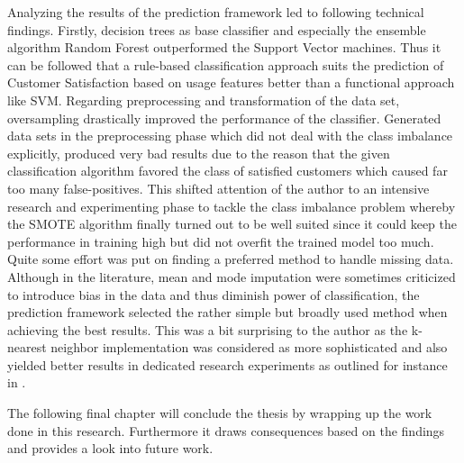 Analyzing the results of the prediction framework led to following technical findings. Firstly, decision trees as base classifier and especially the ensemble algorithm Random Forest outperformed the Support Vector machines. Thus it can be followed that a rule-based classification approach suits the prediction of Customer Satisfaction based on usage features better than a functional approach like SVM. Regarding preprocessing and transformation of the data set, oversampling drastically improved the performance of the classifier. Generated data sets in the preprocessing phase which did not deal with the class imbalance explicitly, produced very bad results due to the reason that the given classification algorithm favored the class of satisfied customers which caused far too many false-positives. This shifted attention of the author to an intensive research and experimenting phase to tackle the class imbalance problem whereby the SMOTE algorithm finally turned out to be well suited since it could keep the performance in training high but did not overfit the trained model too much. Quite some effort was put on finding a preferred method to handle missing data. Although in the literature, mean and mode imputation were sometimes criticized to introduce bias in the data and thus diminish power of classification, the prediction framework selected the rather simple but broadly used method when achieving the best results. This was a bit surprising to the author as the k-nearest neighbor implementation was considered as more sophisticated and also yielded better results in dedicated research experiments as outlined for instance in \cite{batista2003analysis}.

The following final chapter will conclude the thesis by wrapping up the work done in this research. Furthermore it draws consequences based on the findings and provides a look into future work. 